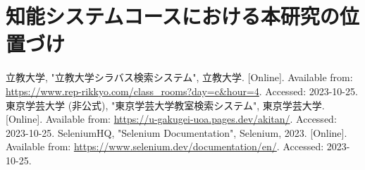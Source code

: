 \documentclass[11pt]{ujarticle}
\begin{document}
\section{知能システムコースにおける本研究の位置づけ}


\begin{thebibliography}{99}
	立教大学, "立教大学シラバス検索システム", 立教大学. [Online]. Available from: \url{https://www.rep-rikkyo.com/class_rooms?day=c&hour=4}. Accessed: 2023-10-25.
	東京学芸大学 (非公式), "東京学芸大学教室検索システム", 東京学芸大学. [Online]. Available from: \url{https://u-gakugei-uoa.pages.dev/akitan/}. Accessed: 2023-10-25.
	SeleniumHQ, "Selenium Documentation", Selenium, 2023. [Online]. Available from: \url{https://www.selenium.dev/documentation/en/}. Accessed: 2023-10-25.
\end{thebibliography}
\end{document}
